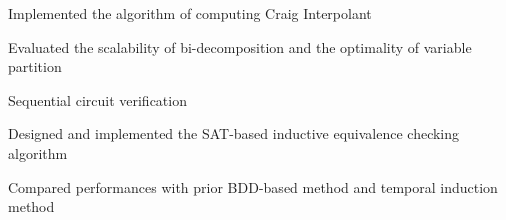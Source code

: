 \begin{myexp}
        \begin{mybullet}
            \item Implemented the algorithm of computing Craig Interpolant
            \item Evaluated the scalability of bi-decomposition and the optimality of variable partition
        \end{mybullet}
    \item Sequential circuit verification
        \begin{mybullet}
            \item Designed and implemented the SAT-based inductive equivalence checking algorithm
            \item Compared performances with prior BDD-based method and temporal induction method
        \end{mybullet}
\end{myexp}
